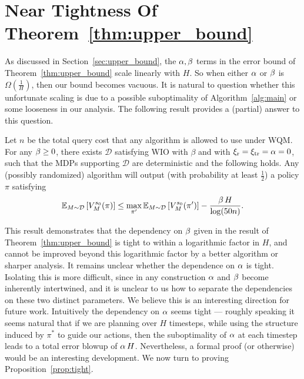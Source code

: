 \documentclass[11pt,twoside]{article}
\begin{document}
\section{Near Tightness Of Theorem~\ref{thm:upper_bound}}
\label{app:prop_tight}
As discussed in Section~\ref{sec:upper_bound}, the $\operatorname{\alpha}, \operatorname{\beta}$ terms in the error bound of Theorem~\ref{thm:upper_bound} scale linearly with $H$. So when either $\operatorname{\alpha}$ or $\operatorname{\beta}$ is $\Omega(\frac{1}{H})$, then our bound becomes vacuous. It is natural to question whether this unfortunate scaling is due to a possible suboptimality of Algorithm~\ref{alg:main} or some looseness in our analysis. The following result provides a (partial) answer to this question.
\begin{proposition}
\label{prop:tight}
Let $n$ be the total query cost that any algorithm is allowed to use under WQM. For any $\operatorname{\beta} \geq 0$, there exists $\mathcal{D}$ satisfying WIO with $\beta$ and \strprox{} with $\operatorname{\xi_r} = \operatorname{\xi_{tr}} = \operatorname{\alpha} = 0$, such that the MDPs supporting $\mathcal{D}$ are deterministic and the following holds. Any (possibly randomized) algorithm will output (with probability at least $\frac{1}{2}$) a policy $\pi$ satisfying
$$
\operatorname{\mathbb{E}}_{M \sim \mathcal{D}} \left[ V^{{s_0 }}_{{M }}({\pi}) \right] \leq \max_{\pi'} \operatorname{\mathbb{E}}_{M \sim \mathcal{D}} \left[ V^{{s_0 }}_{{M }}({\pi'}) \right] - \frac{\operatorname{\beta} H}{\log(50n)}.
$$
\end{proposition}
This result demonstrates that the dependency on $\operatorname{\beta}$ given in the result of Theorem~\ref{thm:upper_bound} is tight to within a logarithmic factor in $H$, and cannot be improved beyond this logarithmic factor by a better algorithm or sharper analysis. It remains unclear whether the dependence on $\operatorname{\alpha}$ is tight. Isolating this is more difficult, since in any construction $\operatorname{\alpha}$ and $\operatorname{\beta}$ become inherently intertwined, and it is unclear to us how to separate the dependencies on these two distinct parameters. We believe this is an interesting direction for future work. Intuitively the dependency on $\operatorname{\alpha}$ seems tight --- roughly speaking it seems natural that if we are planning over $H$ timesteps, while using the structure induced by $\pi^*$ to guide our actions, then the suboptimality of $\operatorname{\alpha}$ at each timestep leads to a total error blowup of $\operatorname{\alpha} H$. Nevertheless, a formal proof (or otherwise) would be an interesting development. We now turn to proving Proposition~\ref{prop:tight}. \\
\end{document}
